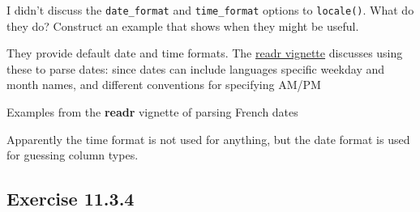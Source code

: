 \documentclass[]{book}
\newenvironment{Shaded}{\begin{snugshade}}{\end{snugshade}}
\newcommand{\CommentTok}[1]{\textcolor[rgb]{0.56,0.35,0.01}{\textit{#1}}}
\newcommand{\DataTypeTok}[1]{\textcolor[rgb]{0.13,0.29,0.53}{#1}}
\newcommand{\KeywordTok}[1]{\textcolor[rgb]{0.13,0.29,0.53}{\textbf{#1}}}
\newcommand{\NormalTok}[1]{#1}
\newcommand{\StringTok}[1]{\textcolor[rgb]{0.31,0.60,0.02}{#1}}
\theoremstyle{plain}
\theoremstyle{remark}
\begin{document}
I didn't discuss the \texttt{date\_format} and \texttt{time\_format}
options to \texttt{locale()}. What do they do? Construct an example that
shows when they might be useful.

They provide default date and time formats. The
\href{https://cran.r-project.org/web/packages/readr/vignettes/locales.html}{readr
vignette} discusses using these to parse dates: since dates can include
languages specific weekday and month names, and different conventions
for specifying AM/PM

\begin{Shaded}
\end{Shaded}

Examples from the \textbf{readr} vignette of parsing French dates

\begin{Shaded}
\end{Shaded}

Apparently the time format is not used for anything, but the date format
is used for guessing column types.

\hypertarget{exercise-11.3.4}{%
\subsection*{\texorpdfstring{Exercise
{11.3.4}}{Exercise 11.3.4}}\label{exercise-11.3.4}}
\end{document}
